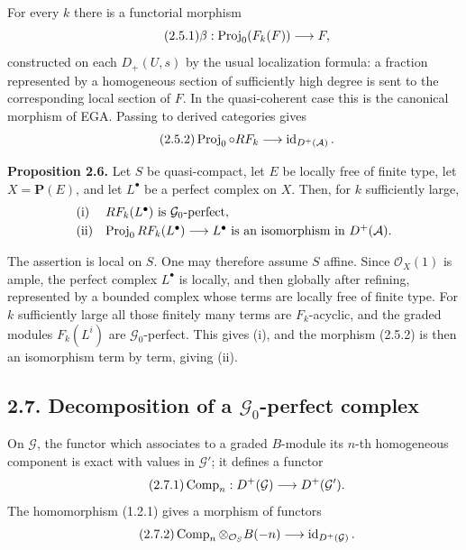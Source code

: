 \documentclass[11pt]{article}
\begin{document}
For every \(k\) there is a functorial morphism
\begin{equation}\tag{2.5.1}
  \beta:\operatorname{Proj}_0(F_k(F))\longrightarrow F,
\end{equation}
constructed on each \(D_+(U,s)\) by the usual localization formula: a fraction represented by a homogeneous section of sufficiently high degree is sent to the corresponding local section of \(F\). In the quasi-coherent case this is the canonical morphism of EGA. Passing to derived categories gives
\begin{equation}\tag{2.5.2}
  \operatorname{Proj}_0\circ RF_k \longrightarrow \operatorname{id}_{D^+(\mathcal A)}.
\end{equation}

\textbf{Proposition 2.6.} Let \(S\) be quasi-compact, let \(E\) be locally free of finite type, let \(X=\mathbf P(E)\), and let \(L^\bullet\) be a perfect complex on \(X\). Then, for \(k\) sufficiently large,
\[
\begin{array}{ll}
\text{\rm (i)}& RF_k(L^\bullet)\text{ is }\mathcal G_0\text{-perfect},\\[1mm]
\text{\rm (ii)}& \operatorname{Proj}_0 RF_k(L^\bullet)\longrightarrow L^\bullet
\text{ is an isomorphism in }D^+(\mathcal A).
\end{array}
\]

The assertion is local on \(S\). One may therefore assume \(S\) affine. Since \(\mathcal O_X(1)\) is ample, the perfect complex \(L^\bullet\) is locally, and then globally after refining, represented by a bounded complex whose terms are locally free of finite type. For \(k\) sufficiently large all those finitely many terms are \(F_k\)-acyclic, and the graded modules \(F_k(L^i)\) are \(\mathcal G_0\)-perfect. This gives (i), and the morphism (2.5.2) is then an isomorphism term by term, giving (ii).

\subsection*{2.7. Decomposition of a \(\mathcal G_0\)-perfect complex}
On \(\mathcal G\), the functor which associates to a graded \(B\)-module its \(n\)-th homogeneous component is exact with values in \(\mathcal G'\); it defines a functor
\begin{equation}\tag{2.7.1}
  \operatorname{Comp}_n:D^+(\mathcal G)\longrightarrow D^+(\mathcal G').
\end{equation}
The homomorphism (1.2.1) gives a morphism of functors
\begin{equation}\tag{2.7.2}
  \operatorname{Comp}_n\otimes_{\mathcal O_S}B(-n)\longrightarrow
  \operatorname{id}_{D^+(\mathcal G)}.
\end{equation}
\end{document}
